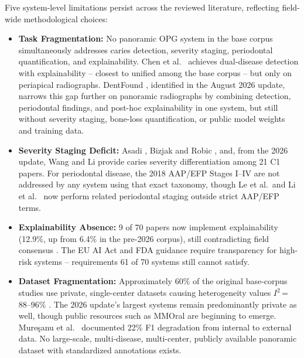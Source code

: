 \documentclass[conference]{IEEEtran}
\begin{document}
Five system-level limitations persist across the reviewed literature,
reflecting field-wide methodological choices:

\begin{itemize}
    \item \textbf{Task Fragmentation:} No panoramic OPG system in the
          base corpus simultaneously addresses caries detection,
          severity staging, periodontal quantification, and
          explainability. Chen et al.\ \cite{chen2023deep} achieves
          dual-disease detection with explainability -- closest to
          unified among the base corpus -- but only on periapical
          radiographs. DentFound \cite{zhu2026dentfound}, identified in
          the August 2026 update, narrows this gap further on
          panoramic radiographs by combining detection, periodontal
          findings, and post-hoc explainability in one system, but
          still without severity staging, bone-loss quantification, or
          public model weights and training data.

    \item \textbf{Severity Staging Deficit:} Asadi
          \cite{asadi2024detection}, Bizjak and Robic
          \cite{bizjak2024advancing}, and, from the 2026 update, Wang
          and Li \cite{wang2026transformer} provide caries severity
          differentiation among 21 C1 papers. For periodontal disease,
          the 2018 AAP/EFP Stages I--IV \cite{chmielewski20252018} are
          not addressed by any system using that exact taxonomy,
          though Le et al.\ and Li et al.\
          \cite{le2026automated,li2025novel} now perform related
          periodontal staging outside strict AAP/EFP terms.

    \item \textbf{Explainability Absence:} 9 of 70 papers now
          implement explainability (12.9\%, up from 6.4\% in the
          pre-2026 corpus), still contradicting field
          consensus
          \cite{nassiri2025yolo,gamal2025automated,sastika2025ai,
          ferrara2025applications,khubrani2025detection}. The EU AI Act
          and FDA guidance require transparency for high-risk systems --
          requirements 61 of 70 systems still cannot satisfy.

    \item \textbf{Dataset Fragmentation:} Approximately 60\% of the
          original base-corpus studies use private, single-center
          datasets causing heterogeneity values $I^2$\,=\,88--96\%
          \cite{iacob2025automated,albano2024artificial,bonfanti2025deep}.
          The 2026 update's largest systems remain predominantly
          private as well, though public resources such as MMOral
          \cite{hao2025mmoral} are beginning to emerge.
          Mure\c{s}anu et al.\ \cite{muresanu2024automating} documented
          22\% F1 degradation from internal to external data. No
          large-scale, multi-disease, multi-center, publicly available
          panoramic dataset with standardized annotations exists.


\end{itemize}
\end{document}
